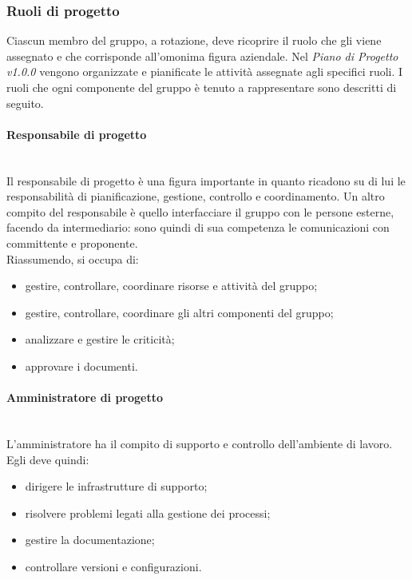 		\subsubsection{Ruoli di progetto}
		Ciascun membro del gruppo, a rotazione, deve ricoprire il ruolo che gli viene assegnato e che corrisponde all'omonima figura aziendale. Nel \textit{Piano di Progetto v1.0.0} vengono organizzate e pianificate le attività assegnate agli specifici ruoli. I ruoli che ogni componente del gruppo è tenuto a rappresentare sono descritti di seguito.
			\paragraph{Responsabile di progetto} \mbox{}\\
			Il responsabile di progetto è una figura importante in quanto ricadono su di lui le responsabilità di pianificazione, gestione, controllo e coordinamento. Un altro compito del responsabile è quello interfacciare il gruppo con le persone esterne, facendo da intermediario: sono quindi di sua competenza le comunicazioni con committente e proponente. \\
			Riassumendo, si occupa di:
			\begin{itemize}
				\item gestire, controllare, coordinare risorse e attività del gruppo;
				\item  gestire, controllare, coordinare gli altri componenti del gruppo;
				\item analizzare e gestire le criticità;
				\item approvare i documenti.
			\end{itemize}
			\paragraph{Amministratore di progetto} \mbox{}\\
			L'amministratore ha il compito di supporto e controllo dell'ambiente di lavoro. \\
			Egli deve quindi:
			\begin{itemize}
				\item dirigere le infrastrutture di supporto;
				\item risolvere problemi legati alla gestione dei processi;
				\item gestire la documentazione;
				\item controllare versioni e configurazioni.%
			\end{itemize}
